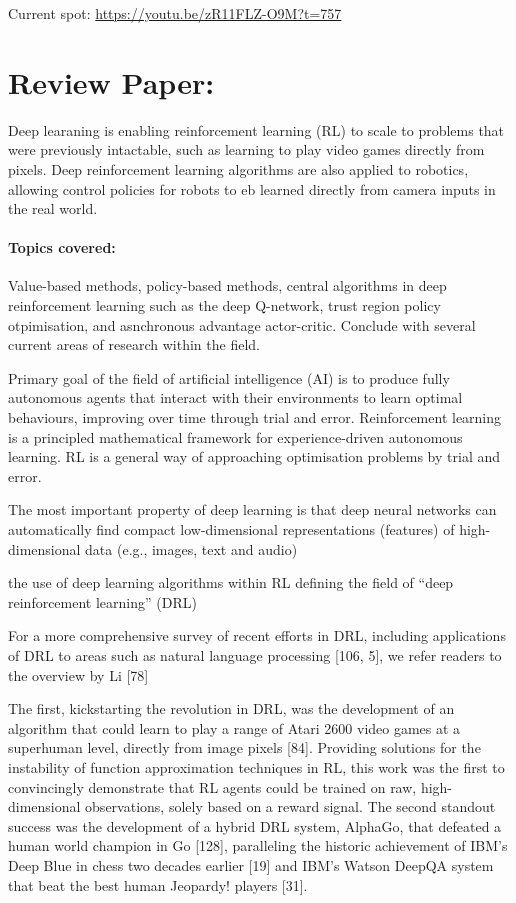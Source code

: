 Current spot: \url{https://youtu.be/zR11FLZ-O9M?t=757}


\section{Review Paper: \cite{arulkumaran2017deep}}

Deep learaning is enabling reinforcement learning (RL) to scale to problems that were previously intactable, such as learning to play video games directly from pixels.  Deep reinforcement learning algorithms are also applied to robotics, allowing control policies for robots to eb learned directly from camera inputs in the real world. 
\paragraph*{Topics covered: }Value-based methods, policy-based methods, central algorithms in deep reinforcement learning such as the deep Q-network, trust region policy otpimisation, and asnchronous advantage actor-critic. Conclude with several current areas of research within the field. 

Primary goal of the field of artificial intelligence (AI) is to produce fully autonomous agents that interact with their environments to learn optimal behaviours, improving over time through trial and error. Reinforcement learning is a principled mathematical framework for experience-driven autonomous learning. RL is a general way of approaching optimisation problems by trial and error.

The most important property of deep learning is that deep neural networks can automatically find compact low-dimensional representations (features) of high-dimensional data (e.g., images, text and audio) 


the use of
deep learning algorithms within RL defining the field of
“deep reinforcement learning” (DRL)

For a more comprehensive survey of recent efforts in
DRL, including applications of DRL to areas such as natural
language processing [106, 5], we refer readers to the overview
by Li [78]


The first, kickstarting the revolution in DRL,
was the development of an algorithm that could learn to play
a range of Atari 2600 video games at a superhuman level,
directly from image pixels [84]. Providing solutions for the
instability of function approximation techniques in RL, this
work was the first to convincingly demonstrate that RL agents
could be trained on raw, high-dimensional observations, solely
based on a reward signal. The second standout success was
the development of a hybrid DRL system, AlphaGo, that
defeated a human world champion in Go [128], paralleling the
historic achievement of IBM’s Deep Blue in chess two decades
earlier [19] and IBM’s Watson DeepQA system that beat the
best human Jeopardy! players [31].


